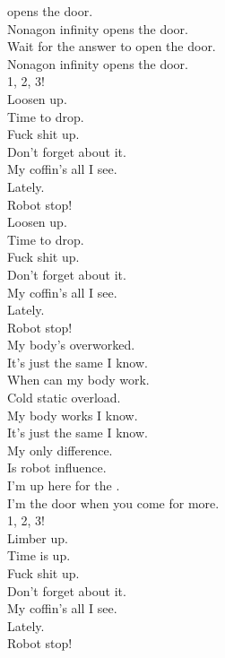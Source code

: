 
\label{album:nonagon-infinity}




 opens the door. \\
Nonagon infinity opens the door. \\
Wait for the answer to open the door. \\
Nonagon infinity opens the door. \\

1, 2, 3! \\
Loosen up. \\
Time to drop. \\
Fuck shit up. \\
Don't forget about it. \\
My coffin's all I see. \\
Lately. \\
Robot stop! \\

Loosen up. \\
Time to drop. \\
Fuck shit up. \\
Don't forget about it. \\
My coffin's all I see. \\
Lately. \\
Robot stop! \\

My body's overworked. \\
It's just the same I know. \\
When can my body work. \\
Cold static overload. \\
My body works I know. \\
It's just the same I know. \\
My only difference. \\
Is robot influence. \\

I'm up here for the . \\
I'm the door when you come for more. \\

1, 2, 3! \\
Limber up. \\
Time is up. \\
Fuck shit up. \\
Don't forget about it. \\
My coffin's all I see. \\
Lately. \\
Robot stop! \\

